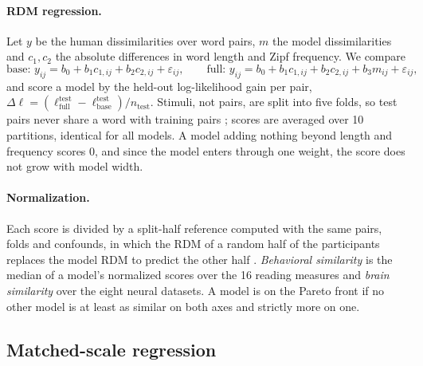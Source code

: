 \paragraph{RDM regression.} Let $y$ be the human dissimilarities over word pairs, $m$ the model dissimilarities and $c_1,c_2$ the absolute differences in word length and Zipf frequency. We compare
\begin{equation}
\text{base: } y_{ij} = b_0 + b_1 c_{1,ij} + b_2 c_{2,ij} + \varepsilon_{ij}, \qquad \text{full: } y_{ij} = b_0 + b_1 c_{1,ij} + b_2 c_{2,ij} + b_3 m_{ij} + \varepsilon_{ij},
\label{eq:rdmreg}
\end{equation}
and score a model by the held-out log-likelihood gain per pair, $\Delta\ell=(\ell^{\mathrm{test}}_{\mathrm{full}}-\ell^{\mathrm{test}}_{\mathrm{base}})/n_{\mathrm{test}}$. Stimuli, not pairs, are split into five folds, so test pairs never share a word with training pairs \citep{schutt2023statistical}; scores are averaged over 10 partitions, identical for all models. A model adding nothing beyond length and frequency scores 0, and since the model enters through one weight, the score does not grow with model width.

\paragraph{Normalization.} Each score is divided by a split-half reference computed with the same pairs, folds and confounds, in which the RDM of a random half of the participants replaces the model RDM to predict the other half \citep{timkey2026dissociation}. \emph{Behavioral similarity} is the median of a model's normalized scores over the 16 reading measures and \emph{brain similarity} over the eight neural datasets. A model is on the Pareto front if no other model is at least as similar on both axes and strictly more on one.

\subsection{Matched-scale regression}
\label{sec:design-stats}

